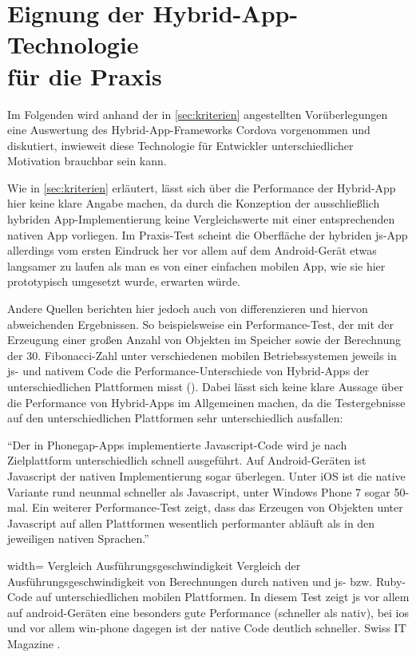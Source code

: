 \section{Eignung der Hybrid-App-Technologie \\ für die Praxis}

Im Folgenden wird anhand der in \autoref{sec:kriterien} angestellten Vorüberlegungen eine Auswertung des Hybrid-App-Frameworks Cordova vorgenommen und diskutiert, inwieweit diese Technologie für Entwickler unterschiedlicher Motivation brauchbar sein kann.

Wie in \autoref{sec:kriterien} erläutert, lässt sich über die Performance der Hybrid-App hier keine klare Angabe machen, da durch die Konzeption der ausschließlich hybriden App-Implementierung keine Vergleichswerte mit einer entsprechenden nativen App vorliegen.
Im Praxis-Test scheint die Oberfläche der hybriden \gls{js}-App allerdings vom ersten Eindruck her vor allem auf dem Android-Gerät etwas langsamer zu laufen als man es von einer einfachen mobilen App, wie sie hier prototypisch umgesetzt wurde, erwarten würde.

Andere Quellen berichten hier jedoch auch von differenzieren und hiervon abweichenden Ergebnissen. 
So beispielsweise ein Performance-Test, der mit der Erzeugung einer großen Anzahl von Objekten im Speicher sowie der Berechnung der 30. Fibonacci-Zahl unter verschiedenen mobilen Betriebssystemen jeweils in \gls{js}- und nativem Code die Performance-Unterschiede von Hybrid-Apps der unterschiedlichen Plattformen misst ().
Dabei lässt sich keine klare Aussage über die Performance von Hybrid-Apps im Allgemeinen machen, da die Testergebnisse auf den unterschiedlichen Plattformen sehr unterschiedlich ausfallen:

\begin{quoting}
	\enquote{Der in Phonegap-Apps implementierte Javascript-Code wird je nach Zielplattform unterschiedlich schnell ausgeführt. Auf Android-Geräten ist Javascript der nativen Implementierung sogar überlegen. Unter iOS ist die native Variante rund neunmal schneller als Javascript, unter Windows Phone 7 sogar 50-mal. Ein weiterer Performance-Test zeigt, dass das Erzeugen von Objekten unter Javascript auf allen Plattformen wesentlich performanter abläuft als in den jeweiligen nativen Sprachen.}~\cite{Eine_App_fr_alle_Plattformen_-_IT_Magazine}
\end{quoting}
	
	{width=\fullimagesize}
	{Vergleich Ausführungsgeschwindigkeit}
	{Vergleich der Ausführungsgeschwindigkeit von Berechnungen durch nativen und \gls{js}- bzw. Ruby-Code auf unterschiedlichen mobilen Plattformen. In diesem Test zeigt \gls{js} vor allem auf \gls{android}-Geräten eine besonders gute Performance (schneller als nativ), bei \gls{ios} und vor allem \gls{win-phone} dagegen ist der native Code deutlich schneller.}
	{Swiss IT Magazine \cite{PerformanceTabelle}.}

